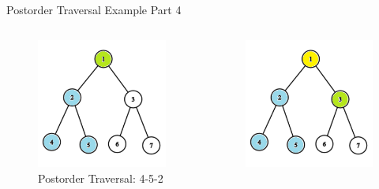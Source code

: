 \documentclass[aspectratio=169]{beamer}%
\begin{document}
\begin{frame}{Postorder Traversal Example Part 4}
    \begin{columns}
        \begin{column}{0.32\textwidth}
            \begin{figure}
                \centering
                \includegraphics[width = .9\linewidth]{tree-post 10.png}
                \caption{Postorder Traversal: 4-5-2}
            \end{figure}
        \end{column}
        \hfill
        \begin{column}{0.32\textwidth}
            \begin{figure}
                \centering
                \includegraphics[width = .9\linewidth]{tree-post 11.png}

\end{figure}
\end{column}
\end{columns}
\end{frame}
\end{document}
